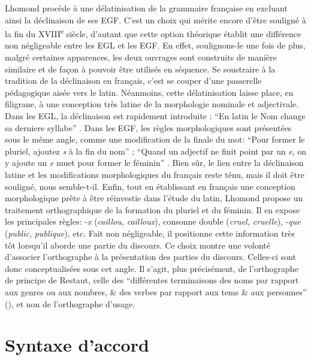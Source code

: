 \documentclass[output=paper]{langsci/langscibook}
\begin{document}
Lhomond procède à une délatinisation de la grammaire française en excluant ainsi la déclinaison de ses EGF. C’est un choix qui mérite encore d’être souligné à la fin du XVIII\textsuperscript{e} siècle, d’autant que cette option théorique établit une différence non négligeable entre les EGL et les EGF. En effet, soulignons-le une fois de plus, malgré certaines apparences, les deux ouvrages sont construits de manière similaire et de façon à pouvoir être utilisés en séquence. Se soustraire à la tradition de la déclinaison en français, c’est se couper d’une passerelle pédagogique aisée vers le latin. Néanmoins, cette délatinisation laisse place, en filigrane, à une conception très latine de la morphologie nominale et adjectivale. Dans les EGL, la déclinaison est rapidement introduite : “En latin le Nom change sa derniere syllabe” \citep[2]{lhomond_elemens_1781}. Dans les EGF, les règles morphologiques sont présentées sous le même angle, comme une modification de la finale du mot: “Pour former le pluriel, ajoutez \textit{s} à la fin du nom” \citep[9]{lhomond_elemens_1790}; “Quand un adjectif ne finit point par un \textit{e}, on y ajoute un \textit{e} muet pour former le féminin” \citep[12]{lhomond_elemens_1790}. Bien sûr, le lien entre la déclinaison latine et les modifications morphologiques du français reste ténu, mais il doit être souligné, nous semble-t-il. Enfin, tout en établissant en français une conception morphologique prête à être réinvestie dans l’étude du latin, Lhomond propose un traitement orthographique de la formation du pluriel et du féminin. Il en expose les principales règles: -\textit{x} (\textit{caillou,} \textit{cailloux}), consonne double (\textit{cruel,} \textit{cruelle}), -\textit{que} (\textit{public,} \textit{publique}), etc. Fait non négligeable, il positionne cette information très tôt lorsqu’il aborde une partie du discours. Ce choix montre une volonté d’associer l’orthographe à la présentation des parties du discours. Celles-ci sont donc conceptualisées sous cet angle. Il s’agit, plus précisément, de l’orthographe de principe de Restaut, celle des “différentes terminaisons des noms par rapport aux genres ou aux nombres, \& des verbes par rapport aux tems \& aux personnes” (\citealt[48]{restaut_principes_1732}), et non de l’orthographe d’usage. 

\section{Syntaxe d’accord}
\end{document}
